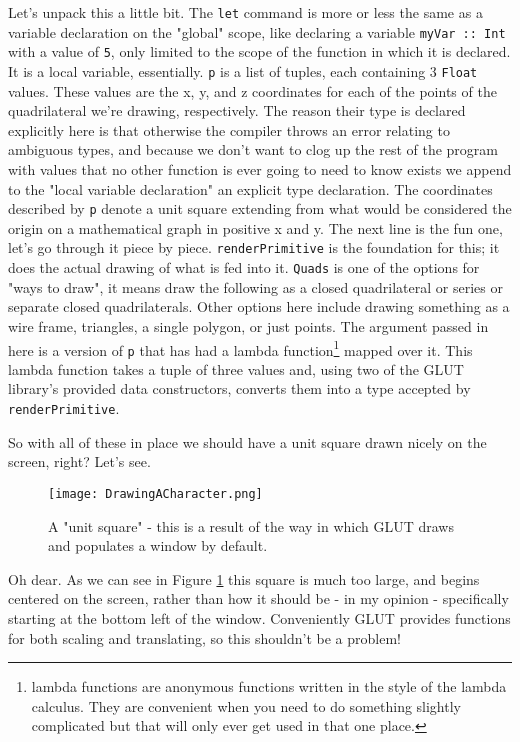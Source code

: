 \documentclass[12pt, a4paper]{report}
\begin{document}
Let's unpack this a little bit.
The \verb|let| command is more or less the same as a variable declaration on the "global" scope, like declaring a variable \verb|myVar :: Int| with a value of \verb|5|, only limited to the scope of the function in which it is declared.
It is a local variable, essentially.
\verb|p| is a list of tuples, each containing 3 \verb|Float| values.
These values are the x, y, and z coordinates for each of the points of the quadrilateral we're drawing, respectively.
The reason their type is declared explicitly here is that otherwise the compiler throws an error relating to ambiguous types, and because we don't want to clog up the rest of the program with values that no other function is ever going to need to know exists we append to the "local variable declaration" an explicit type declaration.
The coordinates described by \verb|p| denote a unit square extending from what would be considered the origin on a mathematical graph in positive x and y.
The next line is the fun one, let's go through it piece by piece.
\verb|renderPrimitive| is the foundation for this; it does the actual drawing of what is fed into it.
\verb|Quads| is one of the options for "ways to draw", it means draw the following as a closed quadrilateral or series or separate closed quadrilaterals.
Other options here include drawing something as a wire frame, triangles, a single polygon, or just points.
The argument passed in here is a version of \verb|p| that has had a lambda function\footnote{lambda functions are anonymous functions written in the style of the lambda calculus. They are convenient when you need to do something slightly complicated but that will only ever get used in that one place.} mapped over it.
This lambda function takes a tuple of three values and, using two of the GLUT library's provided data constructors, converts them into a type accepted by \verb|renderPrimitive|.

\par

So with all of these in place we should have a unit square drawn nicely on the screen, right?
Let's see.

\begin{figure}[ht]
  \centering
  \caption{A "unit square" - this is a result of the way in which GLUT draws and populates a window by default.}
  \texttt{[image: DrawingACharacter.png]}
  \label{fig:drawingacharacter}
\end{figure}

Oh dear.
As we can see in Figure \ref{fig:drawingacharacter} this square is much too large, and begins centered on the screen, rather than how it should be - in my opinion - specifically starting at the bottom left of the window.
Conveniently GLUT provides functions for both scaling and translating, so this shouldn't be a problem!
\end{document}
